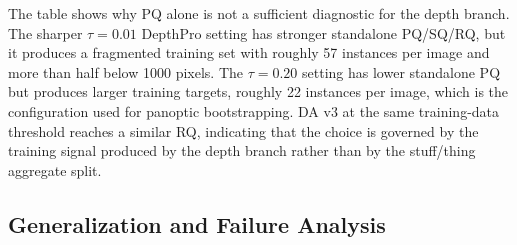\documentclass[10pt,twocolumn,letterpaper]{article}
\begin{document}
The table shows why PQ alone is not a sufficient diagnostic for the depth branch. The sharper $\tau = 0.01$ DepthPro setting has stronger standalone PQ/SQ/RQ, but it produces a fragmented training set with roughly 57 instances per image and more than half below 1000 pixels. The $\tau = 0.20$ setting has lower standalone PQ but produces larger training targets, roughly 22 instances per image, which is the configuration used for panoptic bootstrapping. DA v3 at the same training-data threshold reaches a similar RQ, indicating that the choice is governed by the training signal produced by the depth branch rather than by the stuff/thing aggregate split.


\subsection{Generalization and Failure Analysis}
\label{sec:exp:generalization}
\end{document}
